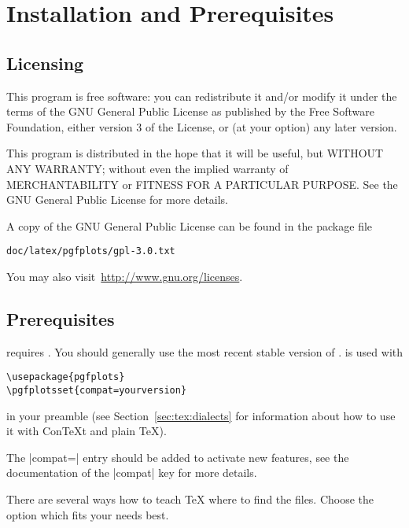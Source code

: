 
\section{Installation and Prerequisites}

\subsection{Licensing}

This program is free software: you can redistribute it and/or modify it under
the terms of the GNU General Public License as published by the Free Software
Foundation, either version 3 of the License, or (at your option) any later
version.

This program is distributed in the hope that it will be useful, but WITHOUT ANY
WARRANTY; without even the implied warranty of MERCHANTABILITY or FITNESS FOR A
PARTICULAR PURPOSE.  See the GNU General Public License for more details.

A copy of the GNU General Public License can be found in the package file
%
\begin{verbatim}
doc/latex/pgfplots/gpl-3.0.txt
\end{verbatim}
%
You may also visit~\url{http://www.gnu.org/licenses}.


\subsection{Prerequisites}

\PGFPlots{} requires \PGF{}. You should generally use the most recent stable
version of \PGF{}. \PGFPlots{} is used with
%
\begin{verbatim}
\usepackage{pgfplots}
\pgfplotsset{compat=yourversion}
\end{verbatim}
%
in your preamble (see Section~\ref{sec:tex:dialects} for information about how
to use it with Con{\TeX}t and plain \TeX{}).

The |compat=| entry should be added to activate new features,
see the documentation of the |compat| key for more details.



There are several ways how to teach \TeX{} where to find the files. Choose the
option which fits your needs best.


